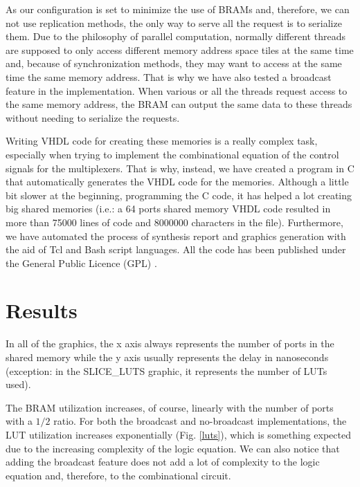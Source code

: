 \documentclass[conference,a4paper]{IEEEtran}
\begin{document}
As our configuration is set to minimize the use of BRAMs and, therefore, we can not use replication methods, the only way to serve all the request is to serialize them. Due to the philosophy of parallel computation, normally different threads are supposed to only access different memory address space tiles at the same time and, because of synchronization methods, they may want to access at the same time the same memory address. That is why we have also tested a broadcast feature in the implementation. When various or all the threads request access to the same memory address, the BRAM can output the same data to these threads without needing to serialize the requests.

Writing VHDL code for creating these memories is a really complex task, especially when trying to implement the combinational equation of the control signals for the multiplexers. That is why, instead, we have created a program in C that automatically generates the VHDL code for the memories. Although a little bit slower at the beginning, programming the C code, it has helped a lot creating big shared memories (i.e.: a 64 ports shared memory VHDL code resulted in more than 75000 lines of code and 8000000 characters in the file). Furthermore, we have automated the process of synthesis report and graphics generation with the aid of Tcl and Bash script languages. All the code has been published under the General Public Licence (GPL) \cite{Source}.



\vspace{7pt}
\section{Results}

In all of the graphics, the x axis always represents the number of ports in the shared memory while the y axis usually represents the delay in nanoseconds (exception: in the SLICE\_LUTS graphic, it represents the number of LUTs used).

The BRAM utilization increases, of course, linearly with the number of ports with a $1/2$ ratio. For both the broadcast and no-broadcast implementations, the LUT utilization increases exponentially (Fig. \ref{luts}), which is something expected due to the increasing complexity of the logic equation. We can also notice that adding the broadcast feature does not add a lot of complexity to the logic equation and, therefore, to the combinational circuit.
\end{document}
